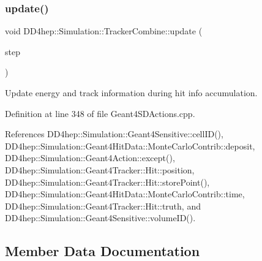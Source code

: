 \hypertarget{struct_d_d4hep_1_1_simulation_1_1_tracker_combine_a3bd30148dcc0b7fa917b000c9946e77f}{}\label{struct_d_d4hep_1_1_simulation_1_1_tracker_combine_a3bd30148dcc0b7fa917b000c9946e77f} 
\subsubsection{\texorpdfstring{update()}{update()}}
{\footnotesize\ttfamily void D\+D4hep\+::\+Simulation\+::\+Tracker\+Combine\+::update (\begin{DoxyParamCaption}\item[{G4\+Step $\ast$}]{step }\end{DoxyParamCaption})\hspace{0.3cm}{\ttfamily [inline]}}



Update energy and track information during hit info accumulation. 



Definition at line 348 of file Geant4\+S\+D\+Actions.\+cpp.



References D\+D4hep\+::\+Simulation\+::\+Geant4\+Sensitive\+::cell\+I\+D(), D\+D4hep\+::\+Simulation\+::\+Geant4\+Hit\+Data\+::\+Monte\+Carlo\+Contrib\+::deposit, D\+D4hep\+::\+Simulation\+::\+Geant4\+Action\+::except(), D\+D4hep\+::\+Simulation\+::\+Geant4\+Tracker\+::\+Hit\+::position, D\+D4hep\+::\+Simulation\+::\+Geant4\+Tracker\+::\+Hit\+::store\+Point(), D\+D4hep\+::\+Simulation\+::\+Geant4\+Hit\+Data\+::\+Monte\+Carlo\+Contrib\+::time, D\+D4hep\+::\+Simulation\+::\+Geant4\+Tracker\+::\+Hit\+::truth, and D\+D4hep\+::\+Simulation\+::\+Geant4\+Sensitive\+::volume\+I\+D().



\subsection{Member Data Documentation}
\hypertarget{struct_d_d4hep_1_1_simulation_1_1_tracker_combine_a93f684a7d6865b0f92a82560b3558d0d}{}\label{struct_d_d4hep_1_1_simulation_1_1_tracker_combine_a93f684a7d6865b0f92a82560b3558d0d} 

